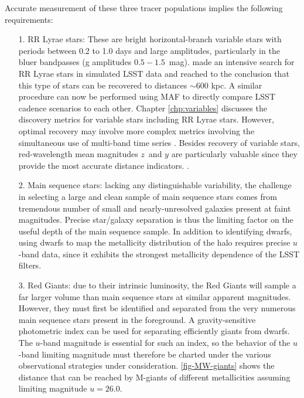 Accurate measurement of these three tracer populations implies the following requirements:


\begin{itemize}

\item[1.] RR Lyrae stars: These are bright horizontal-branch variable
  stars with periods between 0.2 to 1.0 days and large amplitudes,
  particularly in the bluer bandpasses (g amplitudes $0.5 -
  1.5$~mag). \citet{2012AJ....144....9O} made an intensive search for
  RR Lyrae stars in simulated LSST data and reached to the conclusion
  that this type of stars can be recovered to distances $\sim 600$
  kpc. A similar procedure can now be performed using MAF to directly
  compare LSST cadence scenarios to each other.
  Chapter \ref{chp:variables} discusses the
  discovery metrics for variable stars including RR Lyrae
  stars. However, optimal recovery may involve more complex metrics
  involving the simultaneous use of multi-band time series
  \citep{vanderplas15,vivas16}. Besides recovery of variable stars,
  red-wavelength mean magnitudes $z$~and $y$ are particularly
  valuable since they provide the most accurate distance indicators.
\citep{caceres08}.

\item[2.] Main sequence stars: lacking any distinguishable variability, the
challenge in selecting a large and clean sample of main sequence stars comes
from tremendous number of small and nearly-unresolved galaxies present at
faint magnitudes. Precise star/galaxy separation is thus the limiting factor
on the useful depth of the main sequence sample. In addition to identifying
dwarfs, using dwarfs to map the metallicity distribution of the halo requires
precise $u$-band data, since it exhibits the strongest metallicity dependence of
the LSST filters.

\item[3.] Red Giants: due to their intrinsic luminosity, the Red Giants will sample
a far larger volume than main sequence stars at similar apparent magnitudes. However, they must first be identified and separated from the very numerous main
sequence stars present in the foreground. A gravity-sensitive photometric index can
be used for separating efficiently giants from dwarfs. The $u$-band magnitude is essential for such an index, so
the behavior of the $u$-band limiting magnitude must therefore be charted under the various observational strategies under consideration.
\autoref{fig-MW-giants} shows the distance that can be reached
by M-giants of different metallicities assuming limiting magnitude $u = 26.0$.

\end{itemize}

